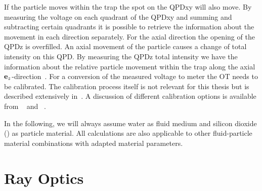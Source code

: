 If the particle moves within the trap the spot on the QPDxy will also move. By 
measuring the voltage on each quadrant of the QPDxy and summing and subtracting 
certain quadrants it is possible to retrieve the information about the movement 
in each direction separately. For the axial direction the opening of the QPDz 
is overfilled. An axial movement of the particle causes a change of total 
intensity on this QPD. By measuring the QPDz total intensity we have the 
information about the relative particle movement within the trap along the 
axial $\vb{e}_{z}$-direction~\cite{Felgner1995a}. For a conversion of the measured 
voltage to meter the OT needs to be calibrated. The calibration process itself 
is not relevant for this thesis but is described extensively 
in~\cite{Lamprecht2017}. A discussion of different calibration options is 
available from \citeauthor{Svoboda1994}~\cite{Svoboda1994} and 
\citeauthor{Jun2004}~\cite{Jun2004}.

In the following, we will always assume water as fluid medium and silicon 
dioxide (\SiO) as particle material. All calculations are also applicable to 
other fluid-particle material combinations with adapted material parameters.

\section{Ray Optics\label{sec:TO-rayoptics}}

